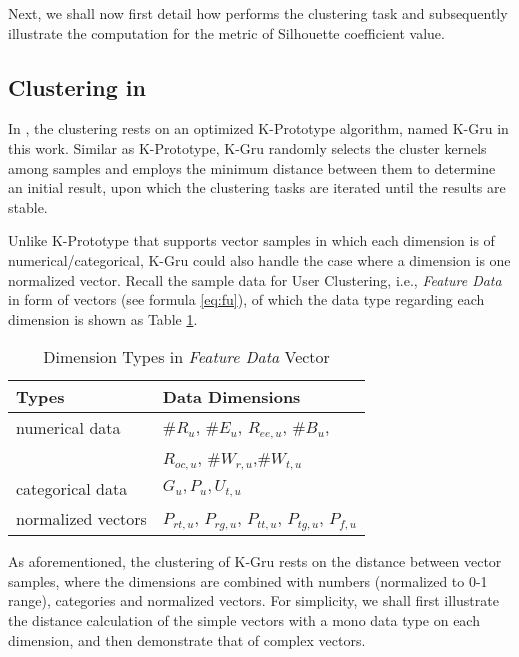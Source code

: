 Next, we shall now first detail how \sys{} performs the clustering task and subsequently illustrate the computation for the metric of Silhouette coefficient value.

\subsection{Clustering in \sys{}}
\label{sec:cluster}

In \sys{}, the clustering rests on an optimized K-Prototype \cite{IEEEexample:huang1997clustering} algorithm, named K-Gru in this work.
Similar as K-Prototype, K-Gru randomly selects the cluster kernels among samples and employs the minimum distance between them to determine an initial result, upon which the clustering tasks are iterated until the results are stable.

Unlike K-Prototype that supports vector samples in which each dimension is of numerical/categorical, K-Gru could also handle the case where a dimension is one normalized vector.
%
Recall the sample data for User Clustering, i.e., \textit{Feature Data} in form of vectors (see formula \ref{eq:fu}), of which the data type regarding each dimension is shown as Table \ref{tbl:data-type}.

\begin{table}[!htb]
\centering
\begin{small}
\caption{Dimension Types in \textit{Feature Data} Vector}
\label{tbl:data-type}
\begin{tabular}{ll}
\toprule
\multicolumn{1}{l}{\textbf{Types}} & \multicolumn{1}{l}{\textbf{Data Dimensions}}	\\	\midrule \midrule
numerical data				& $\#R_u$, $\#E_u$, $R_{ee,u}$, $\#B_u$,\\
                            &  $R_{oc,u}$, $\#W_{r,u}$,$\#W_{t,u}$				\\	\midrule
categorical data			& $G_u, P_u, U_{t,u}$				\\	\midrule
normalized vectors			& $P_{rt,u}$, $P_{rg,u}$, $P_{tt,u}$, $P_{tg,u}$, $P_{f,u}$			\\ \bottomrule
\end{tabular}
\end{small}
\end{table}

As aforementioned, the clustering of K-Gru rests on the distance between vector samples, where the dimensions are combined with numbers (normalized to 0-1 range), categories and normalized vectors. For simplicity, we shall first illustrate the distance calculation of the simple vectors with a mono data type on each dimension, and then demonstrate that of complex vectors. 

